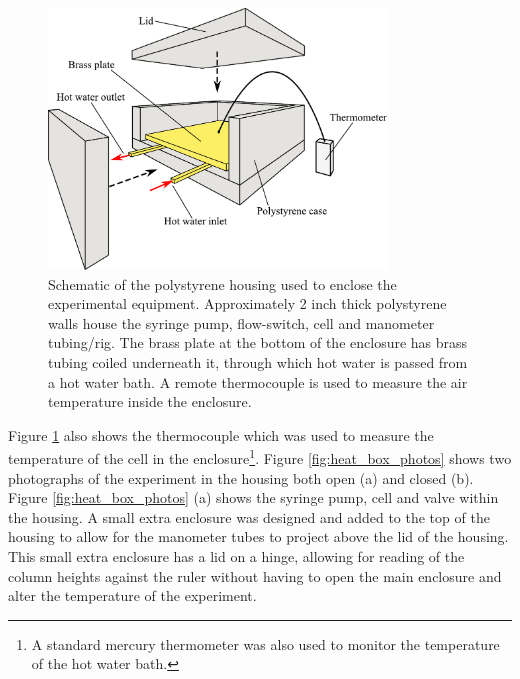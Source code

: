 \begin{figure}
\begin{center}
\includegraphics[width=0.8\textwidth]{Figures/Diode/heat_box_perspective}
\end{center}
\caption[Schematic diagram of housing for temperature controlled experiment]{\label{fig:heat_box_perspective}Schematic of the polystyrene housing used to enclose the experimental equipment. Approximately 2 inch thick polystyrene walls house the syringe pump, flow-switch, cell and manometer tubing/rig. The brass plate at the bottom of the enclosure has brass tubing coiled underneath it, through which hot water is passed from a hot water bath. A remote thermocouple is used to measure the air temperature inside the enclosure.}
\end{figure}

Figure \ref{fig:heat_box_perspective} also shows the thermocouple which was used to measure the temperature of the cell in the enclosure\footnote{A standard mercury thermometer was also used to monitor the temperature of the hot water bath.}. Figure \ref{fig:heat_box_photos} shows two photographs of the experiment in the housing both open (a) and closed (b). Figure \ref{fig:heat_box_photos} (a) shows the syringe pump, cell and valve within the housing. A small extra enclosure was designed and added to the top of the housing to allow for the manometer tubes to project above the lid of the housing. This small extra enclosure has a lid on a hinge, allowing for reading of the column heights against the ruler without having to open the main enclosure and alter the temperature of the experiment.

